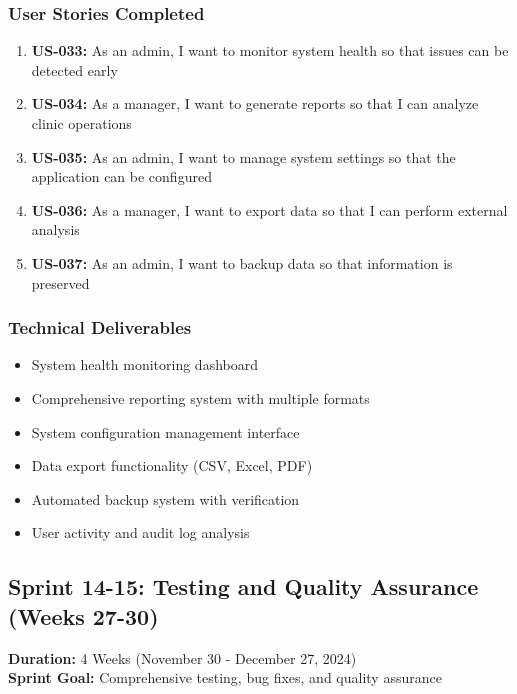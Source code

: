 \documentclass[12pt,a4paper]{article}
\begin{document}
\subsubsection{User Stories Completed}
\begin{enumerate}
    \item \textbf{US-033:} As an admin, I want to monitor system health so that issues can be detected early
    \item \textbf{US-034:} As a manager, I want to generate reports so that I can analyze clinic operations
    \item \textbf{US-035:} As an admin, I want to manage system settings so that the application can be configured
    \item \textbf{US-036:} As a manager, I want to export data so that I can perform external analysis
    \item \textbf{US-037:} As an admin, I want to backup data so that information is preserved
\end{enumerate}

\subsubsection{Technical Deliverables}
\begin{itemize}
    \item System health monitoring dashboard
    \item Comprehensive reporting system with multiple formats
    \item System configuration management interface
    \item Data export functionality (CSV, Excel, PDF)
    \item Automated backup system with verification
    \item User activity and audit log analysis
\end{itemize}

\subsection{Sprint 14-15: Testing and Quality Assurance (Weeks 27-30)}
\textbf{Duration:} 4 Weeks (November 30 - December 27, 2024) \\
\textbf{Sprint Goal:} Comprehensive testing, bug fixes, and quality assurance
\end{document}
